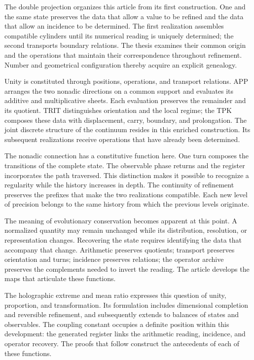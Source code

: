 
The double projection organizes this article from its first construction.
One and the same state preserves the data that allow a value to be refined
and the data that allow an incidence to be determined. The first realization
assembles compatible cylinders until its numerical reading is uniquely
determined; the second transports boundary relations. The thesis examines
their common origin and the operations that maintain their correspondence
throughout refinement. Number and geometrical configuration thereby acquire
an explicit genealogy.

Unity is constituted through positions, operations, and transport relations.
APP arranges the two nonadic directions on a common support and evaluates its
additive and multiplicative sheets. Each evaluation preserves the remainder
and its quotient. TRIT distinguishes orientation and the local regime; the TPK
composes these data with displacement, carry, boundary, and prolongation.
The joint discrete structure of the continuum resides in this enriched
construction. Its subsequent realizations receive operations that have already
been determined.

The nonadic connection has a constitutive function here. One turn composes
the transitions of the complete state. The observable phase returns and the
register incorporates the path traversed. This distinction makes it possible
to recognize a regularity while the history increases in depth. The continuity
of refinement preserves the prefixes that make the two realizations
compatible. Each new level of precision belongs to the same history from
which the previous levels originate.

The meaning of evolutionary conservation becomes apparent at this point.
A normalized quantity may remain unchanged while its distribution,
resolution, or representation changes. Recovering the state requires
identifying the data that accompany that change. Arithmetic preserves
quotients; transport preserves orientation and turns; incidence preserves
relations; the operator archive preserves the complements needed to invert
the reading. The article develops the maps that articulate these functions.

The holographic extreme and mean ratio expresses this question of unity,
proportion, and transformation. Its formulation includes dimensional
completion and reversible refinement, and subsequently extends to balances
of states and observables. The coupling constant occupies a definite position
within this development: the generated register links the arithmetic reading,
incidence, and operator recovery. The proofs that follow construct the
antecedents of each of these functions.
